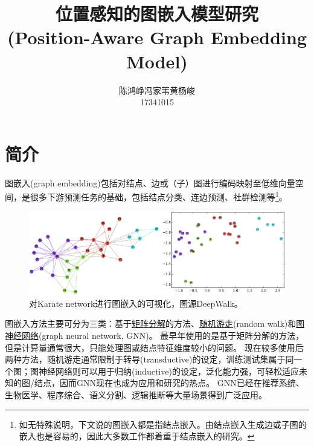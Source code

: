 \documentclass[reportComp]{thesis}
\title{位置感知的图嵌入模型研究\\(Position-Aware Graph Embedding Model)}
\author{陈鸿峥\qquad 冯家苇\qquad 黄杨峻\\%
{\small 17341015\quad 17341035\quad 17341059}}
\begin{document}
\maketitle

\section{简介}
图嵌入(graph embedding)包括对结点、边或（子）图进行编码映射至低维向量空间，是很多下游预测任务的基础，包括结点分类、连边预测、社群检测等\footnote{如无特殊说明，下文说的图嵌入都是指结点嵌入。由结点嵌入生成边或子图的嵌入也是容易的，因此大多数工作都着重于结点嵌入的研究。}。
\begin{figure}[H]
\centering
\includegraphics[width=0.8\linewidth]{fig/graph_embedding_intro.png}
\caption{对Karate network进行图嵌入的可视化，图源DeepWalk\cite{perozzi:deepwalk_kdd_2014}。}
\end{figure}

图嵌入方法主要可分为三类：基于\underline{矩阵分解}的方法、\underline{随机游走}(random walk)和\underline{图神经网络}(graph neural network, GNN)。
最早年使用的是基于矩阵分解的方法，但是计算量通常很大，只能处理图或结点特征维度较小的问题。
现在较多使用后两种方法，随机游走通常限制于转导(transductive)的设定，训练测试集属于同一个图；图神经网络则可以用于归纳(inductive)的设定，泛化能力强，可轻松适应未知的图/结点，因而GNN现在也成为应用和研究的热点。
GNN已经在推荐系统\cite{zhu:aligraph_vldb_2019}、生物医学、程序综合、语义分割、逻辑推断等大量场景得到广泛应用。
\end{document}
